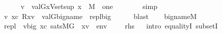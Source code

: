 \begin{isabellebody}
\ \ \ \ \isamarkupfalse%
\ {\isachardoublequoteopen}v\ {\isasymin}\ val{\isacharparenleft}{\kern0pt}G{\isacharcomma}{\kern0pt}{\isacharbraceleft}{\kern0pt}x{\isasymin}Vset{\isacharparenleft}{\kern0pt}{\isacharquery}{\kern0pt}sup{\isacharparenright}{\kern0pt}{\isachardot}{\kern0pt}\ x\ {\isasymin}\ M{\isacharbraceright}{\kern0pt}\ {\isasymtimes}\ {\isacharbraceleft}{\kern0pt}one{\isacharbraceright}{\kern0pt}{\isacharparenright}{\kern0pt}{\isachardoublequoteclose}\isanewline
\ \ \ \ \ \ \isamarkupfalse%
\ simp\isanewline
\ \ \isacommand{{\isacharbraceright}{\kern0pt}}\isamarkupfalse%
\isanewline
\ \ \isamarkupfalse%
\isanewline
\ \ \isamarkupfalse%
\ {\isachardoublequoteopen}{\isacharbraceleft}{\kern0pt}v{\isachardot}{\kern0pt}\ x{\isasymin}c{\isacharcomma}{\kern0pt}\ {\isacharquery}{\kern0pt}R{\isacharparenleft}{\kern0pt}x{\isacharcomma}{\kern0pt}v{\isacharparenright}{\kern0pt}{\isacharbraceright}{\kern0pt}\ {\isasymsubseteq}\ val{\isacharparenleft}{\kern0pt}G{\isacharcomma}{\kern0pt}{\isacharquery}{\kern0pt}big{\isacharunderscore}{\kern0pt}name{\isacharparenright}{\kern0pt}{\isachardoublequoteclose}\ {\isacharparenleft}{\kern0pt}\ {\isachardoublequoteopen}{\isacharquery}{\kern0pt}repl{\isasymsubseteq}{\isacharquery}{\kern0pt}big{\isachardoublequoteclose}{\isacharparenright}{\kern0pt}\isanewline
\ \ \ \ \isamarkupfalse%
\ blast\isanewline
\ \ \isamarkupfalse%
\ {\isacartoucheopen}{\isacharquery}{\kern0pt}big{\isacharunderscore}{\kern0pt}name{\isasymin}M{\isacartoucheclose}\isanewline
\ \ \isamarkupfalse%
\ {\isachardoublequoteopen}{\isacharquery}{\kern0pt}repl\ {\isacharequal}{\kern0pt}\ {\isacharbraceleft}{\kern0pt}v{\isasymin}{\isacharquery}{\kern0pt}big{\isachardot}{\kern0pt}\ {\isasymexists}x{\isasymin}c{\isachardot}{\kern0pt}\ sats{\isacharparenleft}{\kern0pt}M{\isacharbrackleft}{\kern0pt}G{\isacharbrackright}{\kern0pt}{\isacharcomma}{\kern0pt}\ {\isasymphi}{\isacharcomma}{\kern0pt}\ {\isacharbrackleft}{\kern0pt}x{\isacharcomma}{\kern0pt}v{\isacharbrackright}{\kern0pt}\ {\isacharat}{\kern0pt}\ env\ {\isacharparenright}{\kern0pt}{\isacharbraceright}{\kern0pt}{\isachardoublequoteclose}\ {\isacharparenleft}{\kern0pt}\ {\isachardoublequoteopen}{\isacharunderscore}{\kern0pt}\ {\isacharequal}{\kern0pt}\ {\isacharquery}{\kern0pt}rhs{\isachardoublequoteclose}{\isacharparenright}{\kern0pt}\isanewline
\ \ \isamarkupfalse%
{\isacharparenleft}{\kern0pt}intro\ equalityI\ subsetI{\isacharparenright}{\kern0pt}\isanewline

\end{isabellebody}
